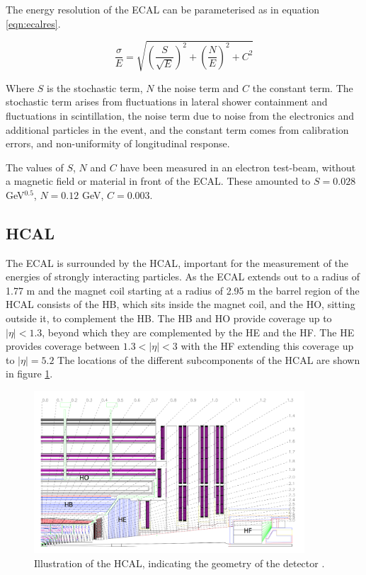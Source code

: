 The energy resolution of the \ac{ECAL} can be parameterised as in
equation \ref{eqn:ecalres}.

\begin{equation}\label{eqn:ecalres}
\frac{\sigma}{E} = \sqrt{(\frac{S}{\sqrt{E}})^2+(\frac{N}{E})^2+C^2}
\end{equation}

Where $S$ is the stochastic term, $N$ the noise term and $C$ the constant term.
The stochastic term arises from fluctuations in lateral shower containment and 
fluctuations in scintillation, the noise term due to noise from the electronics
and additional particles in the event, and the constant term comes
from calibration errors, and non-uniformity of longitudinal response.

The values of $S$, $N$ and $C$ have been measured in an electron
test-beam, without a magnetic field or material in front of the \ac{ECAL}. These
amounted to $S = 0.028$ GeV$^{0.5}$, $N = 0.12$ GeV, $C= 0.003$.



\subsection{\acl{HCAL}}
\label{sec:CMSLHC_CMS_hcal}
The \ac{ECAL} is surrounded by the \ac{HCAL}, important for the
measurement of the energies of strongly interacting particles. As
the \ac{ECAL} extends out to a radius of 1.77 m and the magnet coil
starting at a radius of 2.95 m the barrel region of the \ac{HCAL} consists
of the \ac{HB}, which sits inside the magnet coil, and the \ac{HO}, sitting outside it, 
to complement the \ac{HB}. The \ac{HB} and \ac{HO}  provide coverage up to $|\eta|<1.3$, 
beyond which they are complemented by the \ac{HE} and the \ac{HF}. The \ac{HE} provides
coverage between $1.3<|\eta|<3$ with the \ac{HF} extending this coverage up to $|\eta| = 5.2$
The locations of the different subcomponents of the \ac{HCAL} are shown
in figure \ref{fig:CMS_HCAL}.

\begin{figure}[h!]
\begin{center}
\includegraphics[width=0.9\textwidth]{./Detector/Plots/HCAL.png}
\caption{Illustration of the \ac{HCAL}, indicating the geometry
of the detector \cite{cms-jinst}.}
\label{fig:CMS_HCAL}
\end{center}
\end{figure}

